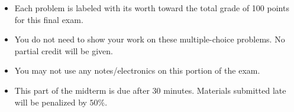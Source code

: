 \documentclass[12pt]{exam}
\newcommand{\<}{\langle}
\renewcommand{\>}{\rangle}
\begin{document}
\begin{center}
\end{center}
\vspace{0.1in}

\vspace{12pt}

\begin{itemize}
  \item Each problem is labeled with its worth toward the total grade
        of 100 points for this final exam.
  \item You do not need to show your work on these multiple-choice problems. No
        partial credit will be given.
  \item You may not use any notes/electronics on this portion of the exam.
  \item This part of the midterm is due after 30 minutes. Materials submitted
        late will be penalized by \(50\%\).
\end{itemize}

\newpage
\end{document}

